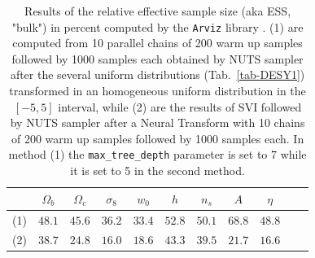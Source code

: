 \documentclass[final,5p,times,twocolumn,authoryear]{elsarticle}
\begin{document}
\begin{table}[htb]
\caption{Results of the relative effective sample size (aka ESS, "bulk") in percent computed by the \texttt{Arviz} library \citep{arviz_2019}. (1) are computed from 10 parallel chains of 200 warm up samples followed by 1000 samples each obtained by NUTS sampler after the several uniform distributions (Tab.~\ref{tab-DESY1}) transformed in an homogeneous uniform distribution in the $[-5,5]$ interval, while (2) are the results of SVI followed by NUTS sampler after a Neural Transform  with 10 chains of 200 warm up samples followed by 1000 samples each. In method (1) the \texttt{max\_tree\_depth} parameter is set to 7 while it is set to 5 in the second method.}
\label{tab-ESS-NUTS_SVI-1}
 \centering
\begin{tabular}{ccccccccccc}
\hline
         & $\Omega_b$ & $\Omega_c$ & $\sigma_8$ & $w_0$ & $h$ & $n_s$ & $A$ & $\eta$\\
\hline
(1) & $48.1$ &  $45.6$     & $36.2$     & $33.4$ & $52.8$ & $50.1$ & $68.8$ & $48.8$\\
(2) & $38.7$ &  $24.8$     & $16.0$     & $18.6$ & $43.3$ & $39.5$ & $21.7$ & $16.6$\\
\hline
\end{tabular}
\end{table}



\appendix
\end{document}
